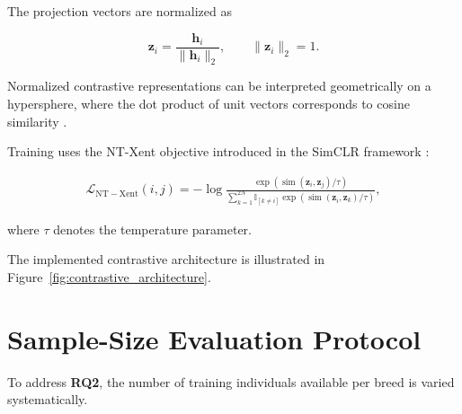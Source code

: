 The projection vectors are normalized as

\begin{equation}
    \mathbf{z}_i
    =
    \frac{
        \mathbf{h}_i
    }{
        \|
            \mathbf{h}_i
        \|_2
    },
    \qquad
    \|
        \mathbf{z}_i
    \|_2
    =
    1.
    \label{eq:hyperspherical_normalization}
\end{equation}

Normalized contrastive representations can be interpreted
geometrically on a hypersphere, where the dot product of unit
vectors corresponds to cosine similarity
\cite{wang2020understanding}.

Training uses the NT-Xent objective introduced in the SimCLR
framework
\cite{chen2020simple}:

\begin{equation}
\begin{split}
    \mathcal{L}_{\mathrm{NT-Xent}}(i,j)
    =
    -\log
    \frac{
        \exp
        \left(
            \operatorname{sim}
            (
                \mathbf{z}_i,
                \mathbf{z}_j
            )
            /
            \tau
        \right)
    }{
        \displaystyle
        \sum_{k=1}^{2N}
        \mathbb{I}_{[k \neq i]}
        \exp
        \left(
            \operatorname{sim}
            (
                \mathbf{z}_i,
                \mathbf{z}_k
            )
            /
            \tau
        \right)
    },
\end{split}
\label{eq:nt_xent}
\end{equation}

where $\tau$ denotes the temperature parameter.





The implemented contrastive architecture is illustrated in
Figure~\ref{fig:contrastive_architecture}.




\section{Sample-Size Evaluation Protocol}
\label{sec:sample_size_protocol}

To address \textbf{RQ2}, the number of training individuals available
per breed is varied systematically.

